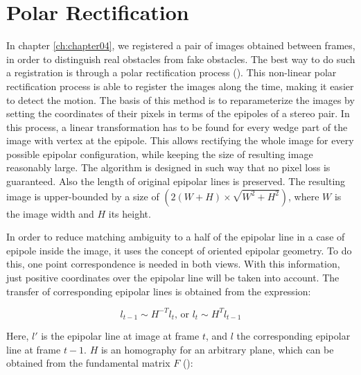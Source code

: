 
\graphicspath{{./images/chapter04/bmps/}{./images/chapter04/vects/}{./images/chapter04/}}

\chapter{Polar Rectification}\label{ch:appendix_polar_calib}

In chapter \ref{ch:chapter04}, we registered a pair of images obtained between frames, in order to distinguish real obstacles from fake obstacles. The best way to do such a registration is through a polar rectification process (\cite{pollefeys1999simple}). This non-linear polar rectification process is able to register the images along the time, making it easier to detect the motion. The basis of this method is to reparameterize the images by setting the coordinates of their pixels in terms of the epipoles of a stereo pair. In this process, a linear transformation has to be found for every wedge part of the image with vertex at the epipole. This allows rectifying the whole image for every possible epipolar configuration, while keeping the size of resulting image reasonably large. The algorithm is designed in such way that no pixel loss is guaranteed. Also the length of original epipolar lines is preserved. The resulting image is upper-bounded by a size of $(2 (W + H) \times \sqrt{W^2 + H^2})$, where $W$ is the image width and $H$ its height. 

In order to reduce matching ambiguity to a half of the epipolar line in a case of epipole inside the image, it uses the concept of oriented epipolar geometry. To do this, one point correspondence is needed in both views. With this information, just positive coordinates over the epipolar line will be taken into account. The transfer of corresponding epipolar lines is obtained from the expression:

\begin{equation}\label{eq:cp04_epipolar_lines}
l_{t - 1} \sim H^{-T}l_t\text{, or }l_t \sim H^T l_{t - 1}
\end{equation}

Here, $l'$ is the epipolar line at image at frame $t$, and $l$ the corresponding epipolar line at frame $t - 1$. $H$ is an homography for an arbitrary plane, which can be obtained from the fundamental matrix $F$ (\cite{luong1996fundamental}):

